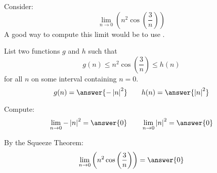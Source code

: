 \documentclass{ximera}
\author{Bart Snapp}
\begin{document}
\begin{exercise}


Consider:
\[
\lim_{n\to 0} \left(n^2 \cos \left(\frac{3}{n}\right)\right)
\]
A good way to compute this limit would be to use .
\begin{exercise}
List two functions $g$ and $h$ such that
\[
g(n)\le n^2 \cos \left(\frac{3}{n}\right) \le h(n)
\]
for all $n$ on some interval containing $n=0$.
\[
g(n)=\answer{-\left| n\right| ^2}\qquad h(n) =\answer{\left| n\right| ^2}
\]
\begin{exercise}
Compute:
\[
\lim_{n \to 0}-\left| n\right| ^2 = \answer{0}\qquad \lim_{n\to 0}\left| n\right| ^2 = \answer{0}
\]
\begin{exercise}
By the Squeeze Theorem:
\[
\lim_{n\to 0} \left(n^2 \cos \left(\frac{3}{n}\right)\right) = \answer{0}
\]
\end{exercise}
\end{exercise}
\end{exercise}
\end{exercise}
\end{document}
